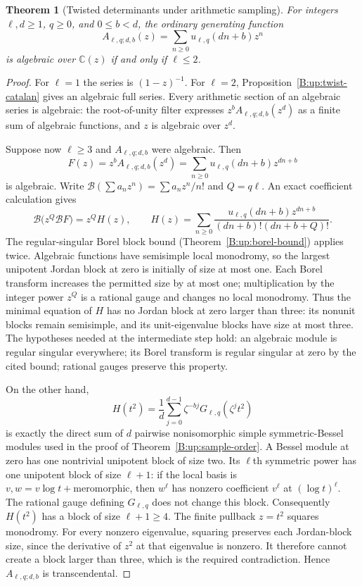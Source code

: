\documentclass[11pt,a4paper]{article}
\newtheorem{theorem}{Theorem}[section]
\theoremstyle{definition}
\theoremstyle{remark}
\newcommand{\C}{\mathbb C}
\numberwithin{equation}{section}
\begin{document}
\begin{theorem}[Twisted determinants under arithmetic sampling]
\label{B:up:twist-all-algebraicity}
For integers $\ell,d\ge1$, $q\ge0$, and $0\le b<d$, the
ordinary generating function
\[
 A_{\ell,q;d,b}(z)=\sum_{n\ge0}u_{\ell,q}(dn+b)z^n
\]
is algebraic over $\C(z)$ if and only if $\ell\le2$.
\end{theorem}
\begin{proof}
For $\ell=1$ the series is $(1-z)^{-1}$.  For $\ell=2$,
Proposition~\ref{B:up:twist-catalan} gives an algebraic full
series.  Every arithmetic section of an algebraic series is
algebraic: the root-of-unity filter expresses
$z^bA_{\ell,q;d,b}(z^d)$ as a finite sum of algebraic
functions, and $z$ is algebraic over $z^d$.

Suppose now $\ell\ge3$ and $A_{\ell,q;d,b}$ were algebraic.
Then
\[
 F(z)=z^bA_{\ell,q;d,b}(z^d)
     =\sum_{n\ge0}u_{\ell,q}(dn+b)z^{dn+b}
\]
is algebraic.  Write $\mathcal B(\sum a_nz^n)
=\sum a_nz^n/n!$ and $Q=q\ell$.  An exact coefficient
calculation gives
\[
 \mathcal B\bigl(z^Q\mathcal B F\bigr)
 =z^Q H(z),\qquad
 H(z)=\sum_{n\ge0}
 \frac{u_{\ell,q}(dn+b)z^{dn+b}}
 {(dn+b)!(dn+b+Q)!}.
\]
The regular-singular Borel block bound
(Theorem~\ref{B:up:borel-bound}) applies twice.  Algebraic
functions have semisimple local monodromy, so the largest
unipotent Jordan block at zero is initially of size at most
one.  Each Borel transform increases the permitted size by
at most one; multiplication by the integer power $z^Q$ is
a rational gauge and changes no local monodromy.  Thus the
minimal equation of $H$ has no Jordan block at zero larger
than three: its nonunit blocks remain semisimple, and its
unit-eigenvalue blocks have size at most three.  The hypotheses needed at the intermediate step
hold: an algebraic module is regular singular everywhere;
its Borel transform is regular singular at zero by the cited
bound; rational gauges preserve this property.

On the other hand,
\[
 H(t^2)=\frac1d\sum_{j=0}^{d-1}\zeta^{-bj}
       G_{\ell,q}(\zeta^jt^2)
\]
is exactly the direct sum of $d$ pairwise nonisomorphic simple
symmetric-Bessel modules used in the proof of
Theorem~\ref{B:up:sample-order}.  A Bessel module at zero has
one nontrivial unipotent block of size two.  Its $\ell$th
symmetric power has one unipotent block of size $\ell+1$:
if the local basis is $v,w=v\log t+\text{meromorphic}$,
then $w^\ell$ has nonzero coefficient $v^\ell$ at
$(\log t)^\ell$.  The rational gauge defining
$G_{\ell,q}$ does not change this block.
Consequently $H(t^2)$ has a block of size $\ell+1\ge4$.
The finite pullback $z=t^2$ squares monodromy.  For every
nonzero eigenvalue, squaring preserves each Jordan-block size,
since the derivative of $z^2$ at that eigenvalue is nonzero.
It therefore cannot create a block larger than three, which is
the required contradiction.  Hence $A_{\ell,q;d,b}$ is transcendental.
\end{proof}
\end{document}
